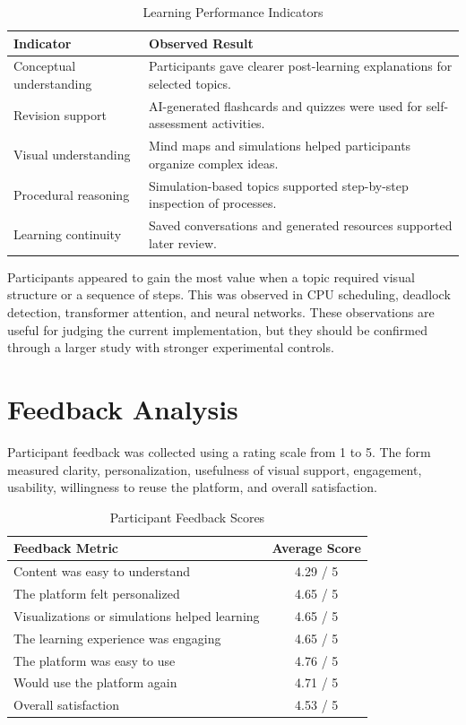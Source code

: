 \begin{table}[H]
\centering
\caption{Learning Performance Indicators}
\begin{tabular}{p{5.8cm}p{5.8cm}}
\toprule
\textbf{Indicator} & \textbf{Observed Result}\\
\midrule
Conceptual understanding & Participants gave clearer post-learning explanations for selected topics.\\
Revision support & AI-generated flashcards and quizzes were used for self-assessment activities.\\
Visual understanding & Mind maps and simulations helped participants organize complex ideas.\\
Procedural reasoning & Simulation-based topics supported step-by-step inspection of processes.\\
Learning continuity & Saved conversations and generated resources supported later review.\\
\bottomrule
\end{tabular}
\label{tab:learning-performance}
\end{table}

Participants appeared to gain the most value when a topic required visual structure or a sequence of steps. This was observed in CPU scheduling, deadlock detection, transformer attention, and neural networks. These observations are useful for judging the current implementation, but they should be confirmed through a larger study with stronger experimental controls.

\section[Feedback Analysis]{\textbf{Feedback Analysis}}
Participant feedback was collected using a rating scale from 1 to 5. The form measured clarity, personalization, usefulness of visual support, engagement, usability, willingness to reuse the platform, and overall satisfaction.

\begin{table}[H]
\centering
\caption{Participant Feedback Scores}
\begin{tabular}{p{7.2cm}c}
\toprule
\textbf{Feedback Metric} & \textbf{Average Score}\\
\midrule
Content was easy to understand & 4.29 / 5\\
The platform felt personalized & 4.65 / 5\\
Visualizations or simulations helped learning & 4.65 / 5\\
The learning experience was engaging & 4.65 / 5\\
The platform was easy to use & 4.76 / 5\\
Would use the platform again & 4.71 / 5\\
Overall satisfaction & 4.53 / 5\\
\bottomrule
\end{tabular}
\label{tab:feedback-scores}
\end{table}

